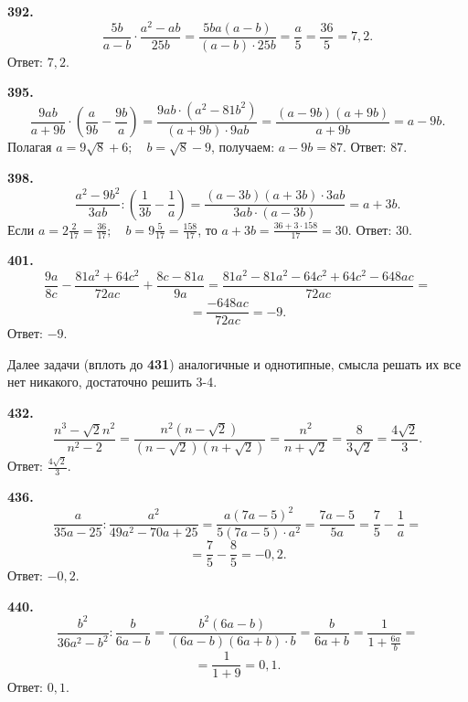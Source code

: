 \textbf{392.} $$\frac{5b}{a-b}\cdot\frac{a^2-ab}{25b}=\frac{5ba\left(a-b\right)}{\left(a-b\right)\cdot25b}=\frac{a}{5}=\frac{36}{5}=7,2.$$ \newline \null \hspace*{\fill} Ответ: $7,2$. 

\textbf{395.} $$\frac{9ab}{a+9b}\cdot\left(\frac{a}{9b}-\frac{9b}{a}\right)=\frac{9ab\cdot\left(a^2-81b^2\right)}{\left(a+9b\right)\cdot9ab}=\frac{\left(a-9b\right)\left(a+9b\right)}{a+9b}=a-9b.$$
Полагая $a=9\sqrt{8}+6;\quad b=\sqrt{8}-9$, получаем: $a-9b=87.$ \newline \null \hspace*{\fill} Ответ: $87$. 

\textbf{398.} $$\frac{a^2-9b^2}{3ab}:\left(\frac{1}{3b}-\frac{1}{a}\right)=\frac{\left(a-3b\right)\left(a+3b\right)\cdot3ab}{3ab\cdot\left(a-3b\right)}=a+3b.$$ Если $a=2\frac{2}{17}=\frac{36}{17};\quad b=9\frac{5}{17}=\frac{158}{17}$, то $a+3b=\frac{36+3\cdot158}{17}=30.$ \newline \null \hspace*{\fill} Ответ: $30$. 

\newpage \textbf{401.} $$\frac{9a}{8c}-\frac{81a^2+64c^2}{72ac}+\frac{8c-81a}{9a}=\frac{81a^2-81a^2-64c^2+64c^2-648ac}{72ac}=$$ $$=\frac{-648ac}{72ac}=-9.$$ \newline \null \hspace*{\fill} Ответ: $-9$. 

Далее задачи (вплоть до \textbf{431})  аналогичные и однотипные, смысла решать их все нет никакого, достаточно решить 3-4.

\textbf{432.} $$\frac{n^3-\sqrt{2}n^2}{n^2-2}=\frac{n^2\left(n-\sqrt{2}\right)}{\left(n-\sqrt2\right)\left(n+\sqrt{2}\right)}=\frac{n^2}{n+\sqrt{2}}=\frac{8}{3\sqrt{2}}=\frac{4\sqrt{2}}{3}.$$ \newline \null \hspace*{\fill} Ответ: $\frac{4\sqrt{2}}{3}$. 

\textbf{436.} $$\frac{a}{35a-25}:\frac{a^2}{49a^2-70a+25}=\frac{a\left(7a-5\right)^2}{5\left(7a-5\right)\cdot a^2}=\frac{7a-5}{5a}=\frac{7}{5}-\frac{1}{a}=$$ $$=\frac{7}{5}-\frac{8}{5}=-0,2.$$ \newline \null \hspace*{\fill} Ответ: $-0,2$. 

\textbf{440.} $$\frac{b^2}{36a^2-b^2}:\frac{b}{6a-b}=\frac{b^2\left(6a-b\right)}{\left(6a-b\right)\left(6a+b\right)\cdot b}=\frac{b}{6a+b}=\frac{1}{1+\frac{6a}{b}}=$$ $$=\frac{1}{1+9}=0,1.$$ \newline \null \hspace*{\fill} Ответ: $0,1$. 

